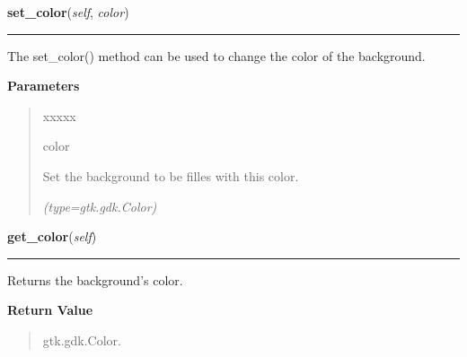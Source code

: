 \hspace{.8\funcindent}\begin{boxedminipage}{\funcwidth}

    \raggedright \textbf{set\_color}(\textit{self}, \textit{color})

    \vspace{-1.5ex}

    \rule{\textwidth}{0.5\fboxrule}
\setlength{\parskip}{2ex}
    The set\_color() method can be used to change the color of the 
    background.

\setlength{\parskip}{1ex}
      \textbf{Parameters}
      \vspace{-1ex}

      \begin{quote}
        \begin{Ventry}{xxxxx}

          \item[color]

          Set the background to be filles with this color.

            {\it (type=gtk.gdk.Color)}

        \end{Ventry}

      \end{quote}

    \end{boxedminipage}

    \label{pygtk_chart:chart:Background:get_color}

    \vspace{0.5ex}

\hspace{.8\funcindent}\begin{boxedminipage}{\funcwidth}

    \raggedright \textbf{get\_color}(\textit{self})

    \vspace{-1.5ex}

    \rule{\textwidth}{0.5\fboxrule}
\setlength{\parskip}{2ex}
    Returns the background's color.

\setlength{\parskip}{1ex}
      \textbf{Return Value}
    \vspace{-1ex}

      \begin{quote}
      gtk.gdk.Color.

      \end{quote}

    \end{boxedminipage}

